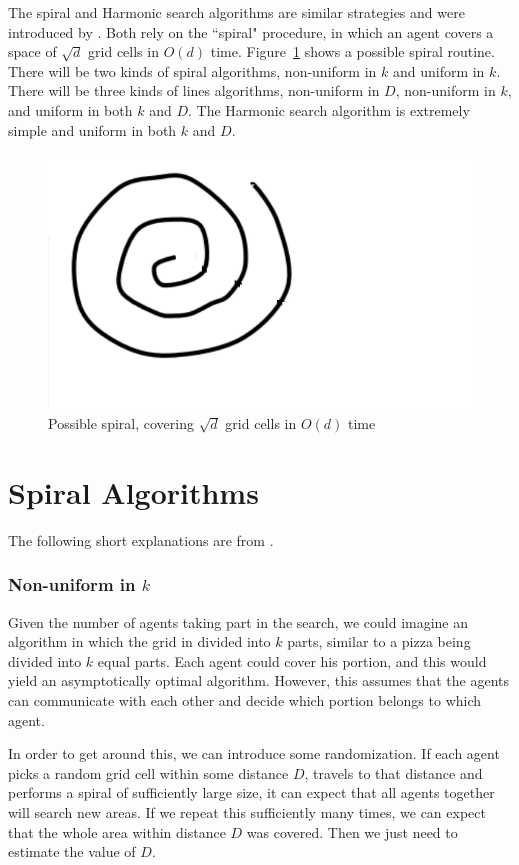 \documentclass[runningheads,a4paper]{llncs}
\begin{document}
The spiral and Harmonic search algorithms are similar strategies and were introduced by \cite{feinerman2012collaborative}. Both rely on the ``spiral" procedure, in which an agent covers a space of $\sqrt{d}$ grid cells in $O(d)$ time. Figure~\ref{fig:spiral} shows a possible spiral routine.
There will be two kinds of spiral algorithms, non-uniform in $k$ and uniform in $k$. There will be three kinds of lines algorithms, non-uniform in $D$, non-uniform in $k$, and uniform in both $k$ and $D$. The Harmonic search algorithm is extremely simple and uniform in both $k$ and $D$. 

\begin{figure}
\centering
\label{fig:spiral}
\includegraphics[width=0.4\linewidth]{justspiral.pdf}
\caption{Possible spiral, covering $\sqrt{d}$ grid cells in $O(d)$ time}
\end{figure}

\section{Spiral Algorithms}
\label{spiral}

The following short explanations are from \cite{feinerman2012collaborative}.

\subsubsection{Non-uniform in $k$}

Given the number of agents taking part in the search, we could imagine an algorithm in which the grid in divided into $k$ parts, similar to a pizza being divided into $k$ equal parts. Each agent could cover his portion, and this would yield an asymptotically optimal algorithm. However, this assumes that the agents can communicate with each other and decide which portion belongs to which agent. 

In order to get around this, we can introduce some randomization. If each agent picks a random grid cell within some distance $D$, travels to that distance and performs a spiral of sufficiently large size, it can expect that all agents together will search new areas. If we repeat this sufficiently many times, we can expect that the whole area within distance $D$ was covered. Then we just need to estimate the value of $D$.
\end{document}
